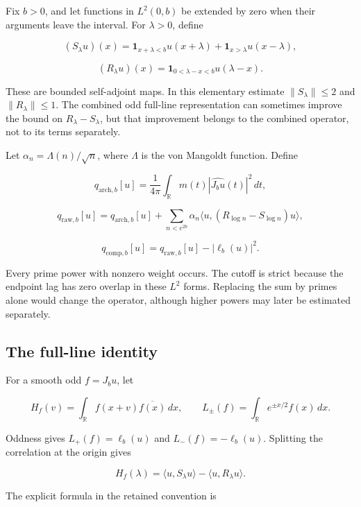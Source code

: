 \documentclass[
  10pt,
  a4paper,
  10pt,
  oneside,
  openany]{book}
\begin{document}
Fix \(b>0\), and let functions in \(L^2(0,b)\) be extended by zero when
their arguments leave the interval. For \(\lambda>0\), define

\[
(S_\lambda u)(x)=\mathbf1_{x+\lambda<b}u(x+\lambda)
                 +\mathbf1_{x>\lambda}u(x-\lambda),
\tag{4.1}\label{eq:4.1}
\]

\[
(R_\lambda u)(x)=\mathbf1_{0<\lambda-x<b}u(\lambda-x).
\tag{4.2}\label{eq:4.2}
\]

These are bounded self-adjoint maps. In this elementary estimate
\(\|S_\lambda\|\le2\) and \(\|R_\lambda\|\le1\). The combined odd
full-line representation can sometimes improve the bound on
\(R_\lambda-S_\lambda\), but that improvement belongs to the combined
operator, not to its terms separately.

Let \(\alpha_n=\Lambda(n)/\sqrt n\), where \(\Lambda\) is the von
Mangoldt function. Define

\[
q_{\mathrm{arch},b}[u]
=\frac1{4\pi}\int_{\mathbb R}m(t)|\widehat{J_bu}(t)|^2\,dt,
\tag{4.3}\label{eq:4.3}
\]

\[
q_{\mathrm{raw},b}[u]
=q_{\mathrm{arch},b}[u]
+\sum_{n<e^{2b}}\alpha_n
\langle u,(R_{\log n}-S_{\log n})u\rangle,
\tag{4.4}\label{eq:4.4}
\]

\[
q_{\mathrm{comp},b}[u]
=q_{\mathrm{raw},b}[u]-|\ell_b(u)|^2.
\tag{4.5}\label{eq:4.5}
\]

Every prime power with nonzero weight occurs. The cutoff is strict
because the endpoint lag has zero overlap in these \(L^2\) forms.
Replacing the sum by primes alone would change the operator, although
higher powers may later be estimated separately.

\subsection{The full-line identity}\label{the-full-line-identity}

For a smooth odd \(f=J_bu\), let

\[
H_f(v)=\int_{\mathbb R}f(x+v)\overline{f(x)}\,dx,
\qquad L_\pm(f)=\int_{\mathbb R}e^{\pm x/2}f(x)\,dx.
\tag{4.6}\label{eq:4.6}
\]

Oddness gives \(L_+(f)=\ell_b(u)\) and \(L_-(f)=-\ell_b(u)\). Splitting
the correlation at the origin gives

\[
H_f(\lambda)
=\langle u,S_\lambda u\rangle-\langle u,R_\lambda u\rangle.
\tag{4.7}\label{eq:4.7}
\]

The explicit formula in the retained convention is
\end{document}
